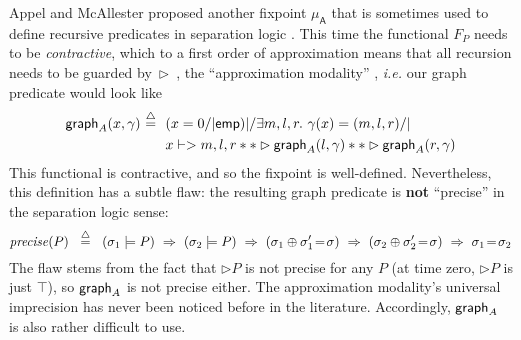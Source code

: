 Appel and McAllester proposed another fixpoint $\mu_{\mathsf{A}}$
that is sometimes used to define recursive predicates in separation
logic \cite{appel:fixpoint}.  This time the functional $F_P$ needs to be
\emph{contractive}, which to a first order of approximation means that
all recursion needs to be guarded by~$\rhd$~, the ``approximation
modality'' \cite{appel:vmm}, \emph{i.e.} our graph predicate would
look like
\begin{align*}
\grapham(x, \gamma) ~ \defeq ~~ &(x = 0 /| \p{emp}) |/ \exists m,l,r.~ \gamma(x)=(m,l,r) /| \null \\
 & x |-> m,l,r ** \rhd \grapham(l, \gamma) ** \rhd \grapham(r, \gamma)
\end{align*}
This functional is contractive, and so the fixpoint is well-defined.  
Nevertheless, this definition has a subtle flaw: the resulting graph
predicate is \textbf{not} ``precise'' in the separation logic sense:
\[
\mathit{precise}(P) ~~ \mathbin{\stackrel{\triangle}{=}} ~~ (\sigma_1 |= P) ~ => ~ (\sigma_2 |= P) ~ => ~ (\sigma_1 \oplus \sigma_1' \! = \! \sigma) ~ => ~ (\sigma_2 \oplus \sigma_2' \! = \! \sigma) ~ => ~ \sigma_1 \! = \! \sigma_2
\]
The flaw stems from the fact that $\rhd P$ is not precise for any $P$ 
(at time zero, $\rhd P$ is just $\top$), 
so $\mathsf{graph}_A$ is not precise either.  The approximation modality's 
universal imprecision has never been noticed before in the literature.
Accordingly, $\mathsf{graph}_A$ is also rather difficult to use.



